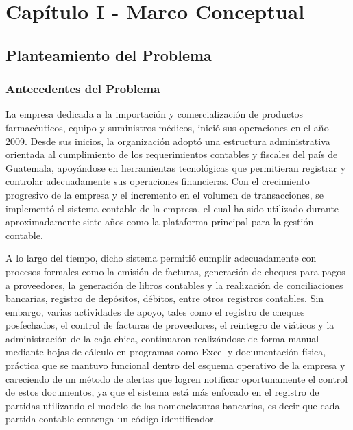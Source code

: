 
\section{Capítulo I - Marco Conceptual}

\subsection{Planteamiento del Problema}

\subsubsection{Antecedentes del Problema}

La empresa dedicada a la importación y comercialización de productos farmacéuticos, equipo y suministros médicos, inició sus operaciones en el año 2009. Desde sus inicios, la organización adoptó una estructura administrativa orientada al cumplimiento de los requerimientos contables y fiscales del país de Guatemala, apoyándose en herramientas tecnológicas que permitieran registrar y controlar adecuadamente sus operaciones financieras. Con el crecimiento progresivo de la empresa y el incremento en el volumen de transacciones, se implementó el sistema contable de la empresa, el cual ha sido utilizado durante aproximadamente siete años como la plataforma principal para la gestión contable.

A lo largo del tiempo, dicho sistema permitió cumplir adecuadamente con procesos formales como la emisión de facturas, generación de cheques para pagos a proveedores, la generación de libros contables y la realización de conciliaciones bancarias, registro de depósitos, débitos, entre otros registros contables. Sin embargo, varias actividades de apoyo, tales como el registro de cheques posfechados, el control de facturas de proveedores, el reintegro de viáticos y la administración de la caja chica, continuaron realizándose de forma manual mediante hojas de cálculo en programas como Excel y documentación física, práctica que se mantuvo funcional dentro del esquema operativo de la empresa y careciendo de un método de alertas que logren notificar oportunamente el control de estos documentos, ya que el sistema está más enfocado en el registro de partidas utilizando el modelo de las nomenclaturas bancarias, es decir que cada partida contable contenga un código identificador.

